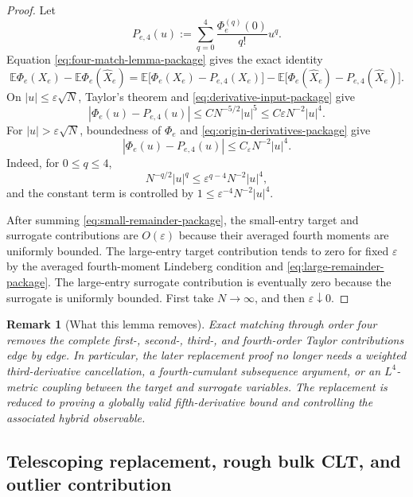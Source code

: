 \documentclass[10pt,a4paper]{amsart}
\newtheorem{remark}[theorem]{Remark}
\newcommand{\E}{\mathbb E}
\begin{document}
\begin{proof}
Let
\[
 P_{e,4}(u):=\sum_{q=0}^4\frac{\Phi_e^{(q)}(0)}{q!}u^q.
\]
Equation \eqref{eq:four-match-lemma-package} gives the exact identity
\[
 \E\Phi_e(X_e)-\E\Phi_e(\widehat X_e)
 =\E\bigl[\Phi_e(X_e)-P_{e,4}(X_e)\bigr]
 -\E\bigl[\Phi_e(\widehat X_e)-P_{e,4}(\widehat X_e)\bigr].
\]
On $|u|\le\varepsilon\sqrt N$, Taylor's theorem and
\eqref{eq:derivative-input-package} give
\begin{equation}\label{eq:small-remainder-package}
 |\Phi_e(u)-P_{e,4}(u)|
 \le C N^{-5/2}|u|^5
 \le C\varepsilon N^{-2}|u|^4.
\end{equation}
For $|u|>\varepsilon\sqrt N$, boundedness of $\Phi_e$ and
\eqref{eq:origin-derivatives-package} give
\begin{equation}\label{eq:large-remainder-package}
 |\Phi_e(u)-P_{e,4}(u)|
 \le C_\varepsilon N^{-2}|u|^4.
\end{equation}
Indeed, for $0\le q\le4$,
\[
 N^{-q/2}|u|^q
 \le\varepsilon^{q-4}N^{-2}|u|^4,
\]
and the constant term is controlled by
$1\le\varepsilon^{-4}N^{-2}|u|^4$.

After summing \eqref{eq:small-remainder-package}, the small-entry target and
surrogate contributions are $O(\varepsilon)$ because their averaged fourth
moments are uniformly bounded.  The large-entry target contribution tends to
zero for fixed $\varepsilon$ by the averaged fourth-moment Lindeberg
condition and \eqref{eq:large-remainder-package}.  The large-entry surrogate
contribution is eventually zero because the surrogate is uniformly bounded.
First take $N\to\infty$, and then $\varepsilon\downarrow0$.
\end{proof}

\begin{remark}[What this lemma removes]
Exact matching through order four removes the complete first-, second-, third-,
and fourth-order Taylor contributions edge by edge.  In particular, the later
replacement proof no longer needs a weighted third-derivative cancellation, a
fourth-cumulant subsequence argument, or an $L^4$-metric coupling between the
target and surrogate variables.  The replacement is reduced to proving a
globally valid fifth-derivative bound and controlling the associated hybrid
observable.
\end{remark}

\subsection{Telescoping replacement, rough bulk CLT, and outlier contribution}
\end{document}
